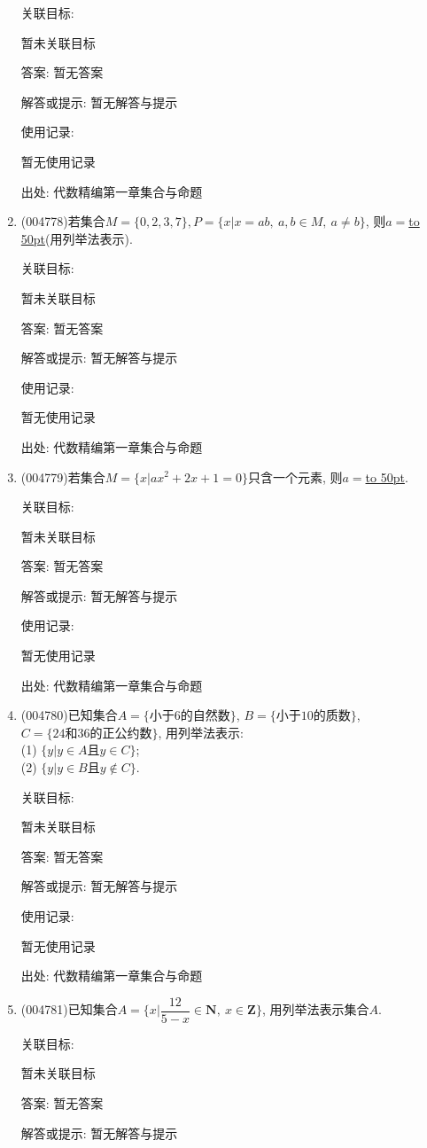 \documentclass[10pt,a4paper]{article}
\newcommand{\blank}[1]{\underline{\hbox to #1pt{}}}
\begin{document}
\begin{enumerate}[1.]
关联目标:

暂未关联目标

答案: 暂无答案

解答或提示: 暂无解答与提示

使用记录:

暂无使用记录


出处: 代数精编第一章集合与命题
\item { (004778)}若集合$M=\{0,2,3,7\},P=\{x|x=ab, \ a,b\in M, \ a\ne b\}$, 则$a=$\blank{50}(用列举法表示).


关联目标:

暂未关联目标

答案: 暂无答案

解答或提示: 暂无解答与提示

使用记录:

暂无使用记录


出处: 代数精编第一章集合与命题
\item { (004779)}若集合$M=\{x|ax^2+2x+1=0\}$只含一个元素, 则$a=$\blank{50}.


关联目标:

暂未关联目标

答案: 暂无答案

解答或提示: 暂无解答与提示

使用记录:

暂无使用记录


出处: 代数精编第一章集合与命题
\item { (004780)}已知集合$A=\{\text{小于}6\text{的自然数}\}$, $B=\{\text{小于}10\text{的质数}\}$, $C=\{24\text{和}36\text{的正公约数}\}$, 用列举法表示:\\
(1) $\{y|y\in A\text{且}y\in C\}$;\\
(2) $\{y|y\in B\text{且}y\notin C\}$.


关联目标:

暂未关联目标

答案: 暂无答案

解答或提示: 暂无解答与提示

使用记录:

暂无使用记录


出处: 代数精编第一章集合与命题
\item { (004781)}已知集合$A=\{x|\dfrac{12}{5-x}\in \mathbf{N},\ x\in\mathbf{Z}\}$, 用列举法表示集合$A$.


关联目标:

暂未关联目标

答案: 暂无答案

解答或提示: 暂无解答与提示


\end{enumerate}
\end{document}
